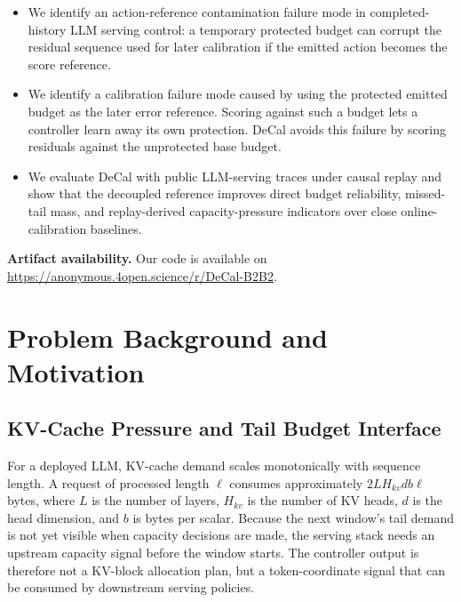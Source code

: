 \documentclass[sigplan,10pt, anonymous]{acmart}
\begin{document}
\begin{itemize}
 \item We identify an action-reference contamination failure mode in completed-history LLM serving control: a temporary protected budget can corrupt the residual sequence used for later calibration if the emitted action becomes the score reference.
\item We identify a calibration failure mode caused by using the protected emitted budget as the later error reference. Scoring against such a budget lets a controller learn away its own protection. DeCal avoids this failure by scoring residuals against the unprotected base budget.
 \item We evaluate DeCal with public LLM-serving traces under causal replay and show that the decoupled reference improves direct budget reliability, missed-tail mass, and replay-derived capacity-pressure indicators over close online-calibration baselines.
\end{itemize}

{\bfseries Artifact availability.}
Our code is available on \textcolor{magenta}{\url{https://anonymous.4open.science/r/DeCal-B2B2}}.

\section{Problem Background and Motivation}
\label{sec:background}

\subsection{KV-Cache Pressure and Tail Budget Interface}
\label{sec:kv-proxy-budget}

For a deployed LLM, KV-cache demand scales monotonically with sequence length. A request of processed length $\ell$ consumes approximately $2LH_{kv}db\ell$ bytes, where $L$ is the number of layers, $H_{kv}$ is the number of KV heads, $d$ is the head dimension, and $b$ is bytes per scalar. Because the next window's tail demand is not yet visible when capacity decisions are made, the serving stack needs an upstream capacity signal before the window starts. The controller output is therefore not a KV-block allocation plan, but a token-coordinate signal that can be consumed by downstream serving policies.
\end{document}
